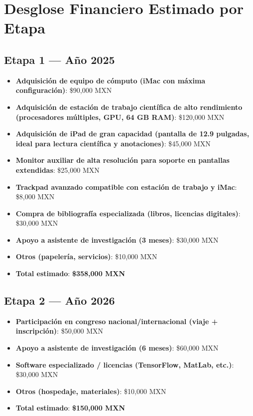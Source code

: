 \documentclass[12pt]{article}
\begin{document}
\section{Desglose Financiero Estimado por Etapa}

\subsection*{Etapa 1 — Año 2025}
\begin{itemize}
  \item \textbf{Adquisición de equipo de cómputo (iMac con máxima configuración)}: \$90,000 MXN
  \item \textbf{Adquisición de estación de trabajo científica de alto rendimiento (procesadores múltiples, GPU, 64 GB RAM)}: \$120,000 MXN
  \item \textbf{Adquisición de iPad de gran capacidad (pantalla de 12.9 pulgadas, ideal para lectura científica y anotaciones)}: \$45,000 MXN
  \item \textbf{Monitor auxiliar de alta resolución para soporte en pantallas extendidas}: \$25,000 MXN
  \item \textbf{Trackpad avanzado compatible con estación de trabajo y iMac}: \$8,000 MXN
  \item \textbf{Compra de bibliografía especializada (libros, licencias digitales)}: \$30,000 MXN
  \item \textbf{Apoyo a asistente de investigación (3 meses)}: \$30,000 MXN
  \item \textbf{Otros (papelería, servicios)}: \$10,000 MXN
  \item \textbf{Total estimado}: \textbf{\$358,000 MXN}
\end{itemize}

\subsection*{Etapa 2 — Año 2026}
\begin{itemize}
  \item \textbf{Participación en congreso nacional/internacional (viaje + inscripción)}: \$50,000 MXN
  \item \textbf{Apoyo a asistente de investigación (6 meses)}: \$60,000 MXN
  \item \textbf{Software especializado / licencias (TensorFlow, MatLab, etc.)}: \$30,000 MXN
  \item \textbf{Otros (hospedaje, materiales)}: \$10,000 MXN
  \item \textbf{Total estimado}: \textbf{\$150,000 MXN}
\end{itemize}
\end{document}

